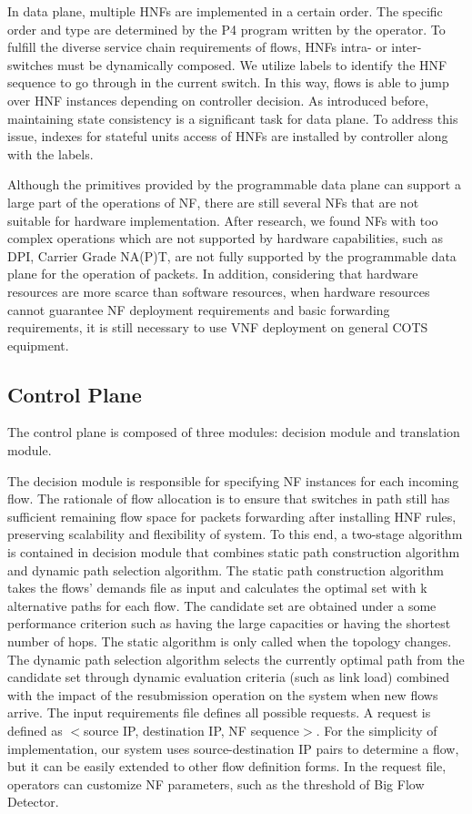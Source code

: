 \documentclass[10pt, conference, letterpaper]{IEEEtran}
\begin{document}
In data plane, multiple HNFs are implemented in a certain order. The specific order and type are determined by the P4 program written by the operator.
To fulfill the diverse service chain requirements of flows, HNFs intra- or inter-switches must be dynamically composed. We utilize labels to identify the HNF sequence to go through in the current switch. In this way, flows is able to jump over HNF instances depending on controller decision.
As introduced before, maintaining state consistency is a significant task for data plane. To address this issue, indexes for stateful units access of HNFs are installed by controller along with the labels.

Although the primitives provided by the programmable data plane can support a large part of the operations of NF, there are still several NFs that are not suitable for hardware implementation. After research, we found NFs with too complex operations which are not supported by hardware capabilities, such as DPI, Carrier Grade NA(P)T, are not fully supported by the programmable data plane for the operation of packets. 
In addition, considering that hardware resources are more scarce than software resources, when hardware resources cannot guarantee NF deployment requirements and basic forwarding requirements, it is still necessary to use VNF deployment on general COTS equipment.


\subsection{Control Plane}\label{BB}
The control plane is composed of three modules: decision module and translation module.

The decision module is responsible for specifying NF instances for each incoming flow. The rationale of flow allocation is to ensure that switches in path still has sufficient remaining flow space for packets forwarding after installing HNF rules, preserving scalability and flexibility of system. To this end, a two-stage algorithm is contained in decision module that combines static path construction algorithm and dynamic path selection algorithm.
The static path construction algorithm takes the flows' demands  file as input and calculates the optimal set with k alternative paths for each flow. The candidate set are obtained under a some performance criterion such as having the large capacities or having the shortest number of hops. The static algorithm is only called when the topology changes.
 The dynamic path selection algorithm selects the currently optimal path from the candidate set through dynamic evaluation criteria (such as link load) combined with the impact of the resubmission operation on the system when new flows arrive. 
 The input requirements file defines all possible requests. A request is defined as $<$source IP, destination IP, NF sequence$>$. For the simplicity of implementation, our system uses source-destination IP pairs to determine a flow, but it can be easily extended to other flow definition forms. In the request file, operators can customize NF parameters, such as the threshold of Big Flow Detector.
\end{document}
